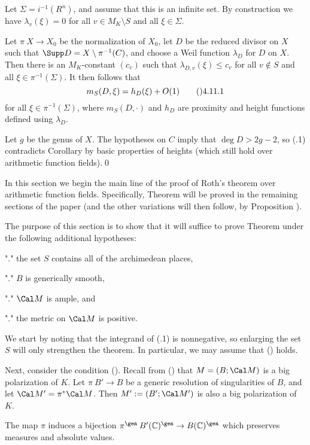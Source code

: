 Let $\Sigma=i^{-1}(R^n)$, and assume that this is an infinite set.
By construction we have $\lambda_v(\xi)=0$ for all $v\in M_K\setminus S$
and all $\xi\in\Sigma$.

Let $\pi\:X\to X_0$ be the normalization of $X_0$, let $D$ be the reduced
divisor on $X$ such that $\Supp D=X\setminus\pi^{-1}(C)$, and choose a Weil
function $\lambda_D$ for $D$ on $X$.  Then there is an $M_K$\snug-constant
$(c_v)$ such that $\lambda_{D,v}(\xi)\le c_v$ for all $v\notin S$ and
all $\xi\in\pi^{-1}(\Sigma)$.  It then follows that
$$m_S(D,\xi) = h_D(\xi) + O(1)\tag\04.11.1$$
for all $\xi\in\pi^{-1}(\Sigma)$, where $m_S(D,\cdot)$ and $h_D$ are proximity
and height functions defined using $\lambda_D$.

Let $g$ be the genus of $X$.  The hypotheses on $C$ imply that $\deg D>2g-2$,
so (.1) contradicts Corollary  by basic properties of heights
(which still hold over arithmetic function fields).\qed
\enddemo


In this section we begin the main line of the proof of Roth's theorem over
arithmetic function fields.  Specifically, Theorem  will be proved
in the remaining sections of the paper
(and the other variations will then follow, by Proposition ).

The purpose of this section is to show that it will suffice to prove
Theorem  under the following additional hypotheses:
\roster
\item"{\bc {}.}" the set $S$ contains all of the archimedean places,
\item"{\bc {}.}" $B$ is generically smooth,
\item"{\bc {}.}" $\Cal M$ is ample, and
\item"{\bc {}.}" the metric on $\Cal M$ is positive.
\endroster

We start by noting that the integrand of (.1) is nonnegative,
so enlarging the set $S$ will only strengthen the theorem.  In particular,
we may assume that () holds.

Next, consider the condition ().  Recall from () that $M=(B;\Cal M)$
is a big polarization of $K$.  Let $\pi\:B'\to B$ be a
generic resolution of singularities of $B$, and let $\Cal M'=\pi^{*}\Cal M$.
Then $M':=(B';\Cal M')$ is also a big polarization of $K$.

The map $\pi$ induces a bijection
$\pi^\gen\:B'(\Bbb C)^\gen\to B(\Bbb C)^\gen$
which preserves measures and absolute values.

